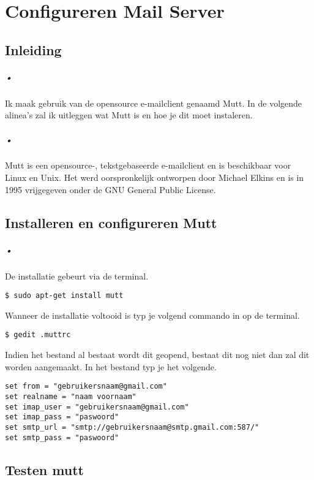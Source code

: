 \documentclass[12pt,a4paper]{report}
\begin{document}
\renewcommand\thechapter{B} %
\chapter{Configureren Mail Server}
\section{Inleiding}
\paragraph{•}
Ik maak gebruik van de opensource e-mailclient genaamd Mutt. In de volgende alinea's zal ik uitleggen wat Mutt is en hoe je dit moet instaleren.
\paragraph{•}
Mutt is een opensource-, tekstgebaseerde e-mailclient en is beschikbaar voor Linux en Unix. Het werd oorspronkelijk ontworpen door Michael Elkins en is in 1995 vrijgegeven onder de GNU General Public License.

\section{Installeren en configureren Mutt}
\paragraph{•}
De installatie gebeurt via de terminal.
\begin{lstlisting}[frame=BTrl]
$ sudo apt-get install mutt
\end{lstlisting}
Wanneer de installatie voltooid is typ je volgend commando in op de terminal.
\begin{lstlisting}[frame=BTrl]
$ gedit .muttrc
\end{lstlisting}
Indien het bestand al bestaat wordt dit geopend, bestaat dit nog niet dan zal dit worden aangemaakt. In het bestand typ je het volgende.
\begin{lstlisting}[frame=BTrl]
set from = "gebruikersnaam@gmail.com"
set realname = "naam voornaam"
set imap_user = "gebruikersnaam@gmail.com"
set imap_pass = "paswoord"
set smtp_url = "smtp://gebruikersnaam@smtp.gmail.com:587/"
set smtp_pass = "paswoord"
\end{lstlisting}

\section{Testen mutt}
\end{document}

